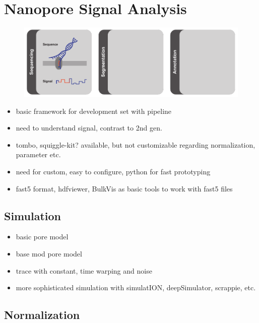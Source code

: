 \chapter{Nanopore Signal Analysis}
\label{cha:signal}

\begin{figure}[h]
    \centering
    \includegraphics[width=1.0\textwidth]{figures/signal/GA.pdf}
    \label{fig:signal:ga}
\end{figure}

\begin{itemize}
	\item basic framework for development set with pipeline
	\item need to understand signal, contrast to 2nd gen.
	\item tombo, squiggle-kit? available, but not customizable regarding normalization, parameter etc.
	\item need for custom, easy to configure, python for fast prototyping
	\item fast5 format, hdfviewer, BulkVis as basic tools to work with fast5 files
\end{itemize}

\section{Simulation}
\label{sec:signal:simulation}

\begin{itemize}
    \item basic pore model
    \item base mod pore model
    \item trace with constant, time warping and noise
    \item more sophisticated simulation with simulatION, deepSimulator, scrappie, etc.
\end{itemize}


\section{Normalization}
\label{sec:signal:normalization}

